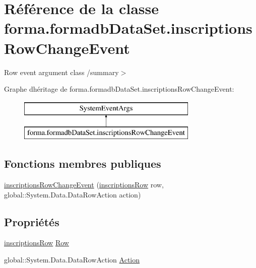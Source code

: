 \hypertarget{classforma_1_1formadb_data_set_1_1inscriptions_row_change_event}{}\section{Référence de la classe forma.\+formadb\+Data\+Set.\+inscriptions\+Row\+Change\+Event}
\label{classforma_1_1formadb_data_set_1_1inscriptions_row_change_event}


Row event argument class /summary$>$  


Graphe d\textquotesingle{}héritage de forma.\+formadb\+Data\+Set.\+inscriptions\+Row\+Change\+Event\+:\begin{figure}[H]
\begin{center}
\leavevmode
\includegraphics[height=2.000000cm]{classforma_1_1formadb_data_set_1_1inscriptions_row_change_event}
\end{center}
\end{figure}
\subsection*{Fonctions membres publiques}
\begin{DoxyCompactItemize}
\item 
\hyperlink{classforma_1_1formadb_data_set_1_1inscriptions_row_change_event_abf271be282e0be351fde723b8de99cc3}{inscriptions\+Row\+Change\+Event} (\hyperlink{classforma_1_1formadb_data_set_1_1inscriptions_row}{inscriptions\+Row} row, global\+::\+System.\+Data.\+Data\+Row\+Action action)
\end{DoxyCompactItemize}
\subsection*{Propriétés}
\begin{DoxyCompactItemize}
\item 
\hyperlink{classforma_1_1formadb_data_set_1_1inscriptions_row}{inscriptions\+Row} \hyperlink{classforma_1_1formadb_data_set_1_1inscriptions_row_change_event_a4556346c22c9696250e4141018baac72}{Row}
\item 
global\+::\+System.\+Data.\+Data\+Row\+Action \hyperlink{classforma_1_1formadb_data_set_1_1inscriptions_row_change_event_ad4148ad7b1135c523f1f8ae42ae941f6}{Action}
\end{DoxyCompactItemize}


